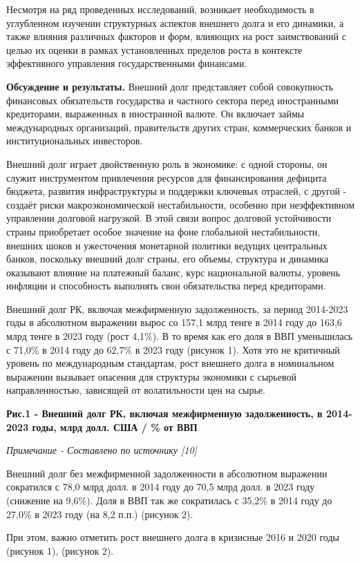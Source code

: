 \begin{multicols}{2}
Несмотря на ряд проведенных исследований, возникает необходимость в
углубленном изучении структурных аспектов внешнего долга и его динамики,
а также влияния различных факторов и форм, влияющих на рост
заимствований с целью их оценки в рамках установленных пределов роста в
контексте эффективного управления государственными финансами.

{\bfseries Обсуждение и результаты.} Внешний долг представляет собой
совокупность финансовых обязательств государства и частного сектора
перед иностранными кредиторами, выраженных в иностранной валюте. Он
включает займы международных организаций, правительств других стран,
коммерческих банков и институциональных инвесторов.

Внешний долг играет двойственную роль в экономике: с одной стороны, он
служит инструментом привлечения ресурсов для финансирования дефицита
бюджета, развития инфраструктуры и поддержки ключевых отраслей, с другой
- создаёт риски макроэкономической нестабильности, особенно при
неэффективном управлении долговой нагрузкой. В этой связи вопрос
долговой устойчивости страны приобретает особое значение на фоне
глобальной нестабильности, внешних шоков и ужесточения монетарной
политики ведущих центральных банков, поскольку внешний долг страны, его
объемы, структура и динамика оказывают влияние на платежный баланс, курс
национальной валюты, уровень инфляции и способность выполнять свои
обязательства перед кредиторами.

Внешний долг РК, включая межфирменную задолженность, за период 2014-2023
годы в абсолютном выражении вырос со 157,1 млрд тенге в 2014 году до
163,6 млрд тенге в 2023 году (рост 4,1\%). В то время как его доля в ВВП
уменьшилась с 71,0\% в 2014 году до 62,7\% в 2023 году (рисунок 1). Хотя
это не критичный уровень по международным стандартам, рост внешнего
долга в номинальном выражении вызывает опасения для структуры экономики
с сырьевой направленностью, зависящей от волатильности цен на сырье.
\end{multicols}

{\bfseries Рис.1 - Внешний долг РК, включая межфирменную задолженность, в 2014-2023 годы, млрд долл. США / \% от ВВП}

\emph{Примечание - Составлено по источнику {[}10{]}}

\begin{multicols}{2}
Внешний долг без межфирменной задолженности в абсолютном выражении
сократился с 78,0 млрд долл. в 2014 году до 70,5 млрд долл. в 2023 году
(снижение на 9,6\%). Доля в ВВП так же сократилась с 35,2\% в 2014 году
до 27,0\% в 2023 году (на 8,2 п.п.) (рисунок 2).

При этом, важно отметить рост внешнего долга в кризисные 2016 и 2020
годы (рисунок 1), (рисунок 2).
\end{multicols}

